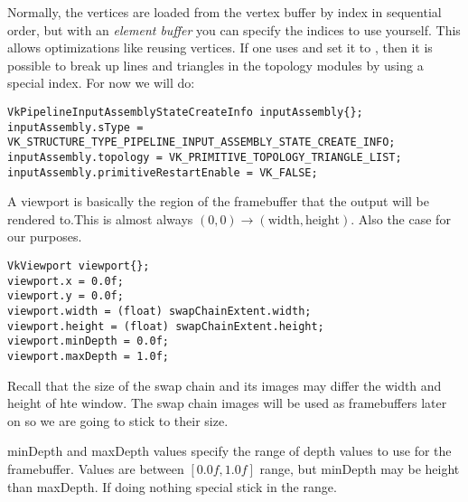 \par Normally, the vertices are loaded from the vertex buffer by index in sequential order, but with an \emph{element buffer} you can specify the indices to use yourself. This allows optimizations like reusing vertices. If one uses  and set it to , then it is possible to break up lines and triangles in the  topology modules by using a special index. For now we will do:

\begin{center}
\begin{minipage}{0.95\linewidth}
\begin{lstlisting}
VkPipelineInputAssemblyStateCreateInfo inputAssembly{};
inputAssembly.sType = VK_STRUCTURE_TYPE_PIPELINE_INPUT_ASSEMBLY_STATE_CREATE_INFO;
inputAssembly.topology = VK_PRIMITIVE_TOPOLOGY_TRIANGLE_LIST;
inputAssembly.primitiveRestartEnable = VK_FALSE;
\end{lstlisting}
\end{minipage}
\end{center}


\par A viewport is basically the region of the framebuffer that the output will be rendered to.This is almost always $(0,0) \to (\text{width}, \text{height})$. Also the case for our purposes.

\begin{center}
\begin{minipage}{0.95\linewidth}
\begin{lstlisting}
VkViewport viewport{};
viewport.x = 0.0f;
viewport.y = 0.0f;
viewport.width = (float) swapChainExtent.width;
viewport.height = (float) swapChainExtent.height;
viewport.minDepth = 0.0f;
viewport.maxDepth = 1.0f;
\end{lstlisting}
\end{minipage}
\end{center}

\par Recall that the size of the swap chain and its images may differ the width and height of hte window. The swap chain images will be used as framebuffers later on so we are going to stick to their size.

\par minDepth and maxDepth values specify the range of depth values to use for the framebuffer. Values are between $\left[ 0.0f, 1.0f \right] $ range, but minDepth may be height than maxDepth. If doing nothing special stick in the range.

